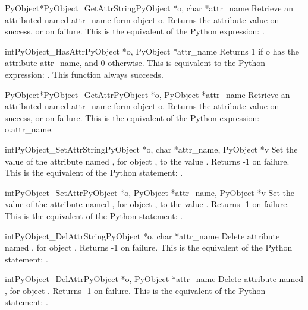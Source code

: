      \begin{cfuncdesc}{PyObject*}{PyObject_GetAttrString}{PyObject *o, char *attr_name}
	 Retrieve an attributed named attr_name form object o.
	 Returns the attribute value on success, or {\NULL} on failure.
	 This is the equivalent of the Python expression: .
     \end{cfuncdesc}


     \begin{cfuncdesc}{int}{PyObject_HasAttr}{PyObject *o, PyObject *attr_name}
         Returns 1 if o has the attribute attr_name, and 0 otherwise.
	 This is equivalent to the Python expression:
	 . 
	 This function always succeeds.
     \end{cfuncdesc}


     \begin{cfuncdesc}{PyObject*}{PyObject_GetAttr}{PyObject *o, PyObject *attr_name}
	 Retrieve an attributed named attr_name form object o.
	 Returns the attribute value on success, or {\NULL} on failure.
	 This is the equivalent of the Python expression: o.attr_name.
     \end{cfuncdesc}


     \begin{cfuncdesc}{int}{PyObject_SetAttrString}{PyObject *o, char *attr_name, PyObject *v}
	 Set the value of the attribute named , for object ,
	 to the value . Returns -1 on failure.  This is
	 the equivalent of the Python statement: .
     \end{cfuncdesc}


     \begin{cfuncdesc}{int}{PyObject_SetAttr}{PyObject *o, PyObject *attr_name, PyObject *v}
	 Set the value of the attribute named , for
	 object ,
	 to the value . Returns -1 on failure.  This is
	 the equivalent of the Python statement: .
     \end{cfuncdesc}


     \begin{cfuncdesc}{int}{PyObject_DelAttrString}{PyObject *o, char *attr_name}
	 Delete attribute named , for object . Returns -1 on
	 failure.  This is the equivalent of the Python
	 statement: .
     \end{cfuncdesc}


     \begin{cfuncdesc}{int}{PyObject_DelAttr}{PyObject *o, PyObject *attr_name}
	 Delete attribute named , for object . Returns -1 on
	 failure.  This is the equivalent of the Python
	 statement: .
     \end{cfuncdesc}


